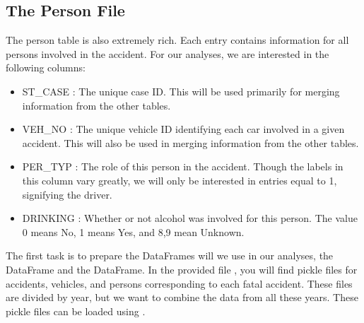 \subsection*{The Person File}
The person table is also extremely rich. Each entry contains information for all
persons involved in the accident. For our analyses, we are interested in the
following columns:
\begin{itemize}
    \item ST\_CASE : The unique case ID. This will be used primarily for merging
        information from the other tables.
    \item VEH\_NO : The unique vehicle ID identifying each car involved in a given
        accident. This will also be used in merging information from the other
        tables.
    \item PER\_TYP : The role of this person in the accident. Though the labels in
        this column vary greatly, we will only be interested in entries equal to
        1, signifying the driver.
    \item DRINKING : Whether or not alcohol was involved for this person. The value
        0 means No, 1 means Yes, and 8,9 mean Unknown.
\end{itemize}

The first task is to prepare the DataFrames will we use in our analyses,
the  DataFrame and the  DataFrame.
In the provided file , you will find pickle files for accidents,
vehicles, and persons corresponding to each fatal accident. These files are
divided by year, but we want to combine the data from all these years. These
pickle files can be loaded using .

